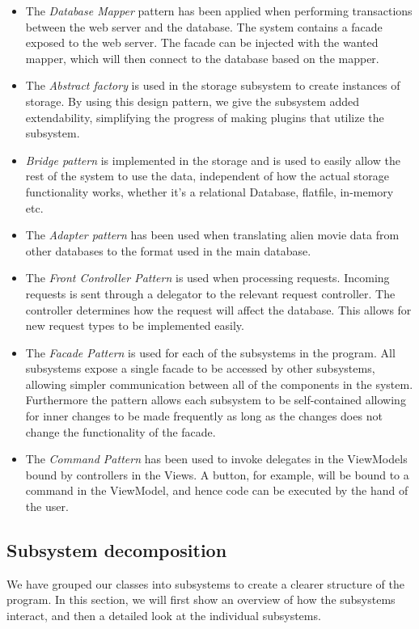 \begin{itemize}
	\item The \emph{Database Mapper} pattern has been applied when performing transactions between the web server and the database. The system contains a facade exposed to the web server. The facade can be injected with the wanted mapper, which will then connect to the database based on the mapper.
	\item The \emph{Abstract factory} is used in the storage subsystem to create instances of storage. By using this design pattern, we give the subsystem added extendability, simplifying the progress of making plugins that utilize the subsystem.
	\item \emph{Bridge pattern} is implemented in the storage and is used to easily allow the rest of the system to use the data, independent of how the actual storage functionality works, whether it's a relational Database, flatfile, in-memory etc.
	\item The \emph{Adapter pattern} has been used when translating alien movie data from other databases to the format used in the main database.
	\item The \emph{Front Controller Pattern} is used when processing requests. Incoming requests is sent through a delegator to the relevant request controller. The controller determines how the request will affect the database. This allows for new request types to be implemented easily.
	\item The \emph{Facade Pattern} is used for each of the subsystems in the program. All subsystems expose a single facade to be accessed by other subsystems, allowing simpler communication between all of the components in the system. Furthermore the pattern allows each subsystem to be self-contained allowing for inner changes to be made frequently as long as the changes does not change the functionality of the facade.
	\item The \emph{Command Pattern} has been used to invoke delegates in the ViewModels bound by controllers in the Views. A button, for example, will be bound to a command in the ViewModel, and hence code can be executed by the hand of the user.
\end{itemize}

\subsection{Subsystem decomposition}
\label{sec:Subsystem decomposition}
We have grouped our classes into subsystems to create a clearer structure of the program. In this section, we will first show an overview of how the subsystems interact, and then a detailed look at the individual subsystems.\\


